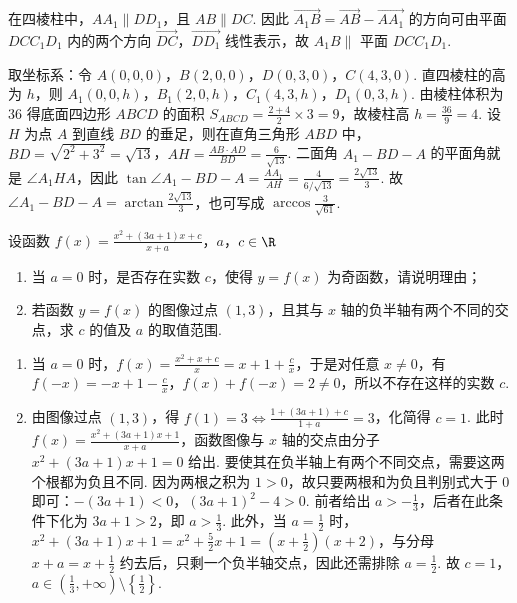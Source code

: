 \begin{solution}
在四棱柱中，\(AA_1\parallel DD_1\)，且 \(AB\parallel DC\). 因此 \(\overrightarrow{A_1B}=\overrightarrow{AB}-\overrightarrow{AA_1}\) 的方向可由平面 \(DCC_1D_1\) 内的两个方向 \(\overrightarrow{DC}\)，\(\overrightarrow{DD_1}\) 线性表示，故 \(A_1B\parallel\) 平面 \(DCC_1D_1\).

取坐标系：令 \(A(0,0,0)\)，\(B(2,0,0)\)，\(D(0,3,0)\)，\(C(4,3,0)\). 直四棱柱的高为 \(h\)，则 \(A_1(0,0,h)\)，\(B_1(2,0,h)\)，\(C_1(4,3,h)\)，\(D_1(0,3,h)\). 由棱柱体积为 \(36\) 得底面四边形 \(ABCD\) 的面积 \(S_{ABCD}=\frac{2+4}{2}\times 3=9\)，故棱柱高 \(h=\frac{36}{9}=4\).
设 \(H\) 为点 \(A\) 到直线 \(BD\) 的垂足，则在直角三角形 \(ABD\) 中，\(BD=\sqrt{2^2+3^2}=\sqrt{13}\)，\(AH=\frac{AB\cdot AD}{BD}=\frac{6}{\sqrt{13}}\). 二面角 \(A_1-BD-A\) 的平面角就是 \(\angle A_1HA\)，因此 \(\tan\angle A_1-BD-A=\frac{AA_1}{AH}=\frac{4}{6/\sqrt{13}}=\frac{2\sqrt{13}}{3}\). 故 \(\angle A_1-BD-A=\arctan\frac{2\sqrt{13}}{3}\)，也可写成 \(\arccos\frac{3}{\sqrt{61}}\).
\end{solution}

\begin{problem}
设函数 \(f(x)=\frac{x^2+(3a+1)x+c}{x+a}\)，\(a\)，\(c\in\R\)
\begin{enumerate}
\item 当 \(a=0\) 时，是否存在实数 \(c\)，使得 \(y=f(x)\) 为奇函数，请说明理由；
\item 若函数 \(y=f(x)\) 的图像过点 \((1,3)\)，且其与 \(x\) 轴的负半轴有两个不同的交点，求 \(c\) 的值及 \(a\) 的取值范围.
\end{enumerate}
\end{problem}

\begin{solution}
\begin{enumerate}
\item 当 \(a=0\) 时，\(f(x)=\frac{x^2+x+c}{x}=x+1+\frac{c}{x}\)，于是对任意 \(x\ne 0\)，有 \(f(-x)=-x+1-\frac{c}{x}\)，\(f(x)+f(-x)=2\neq 0\)，所以不存在这样的实数 \(c\).

\item 由图像过点 \((1,3)\)，得 \(f(1)=3\iff \frac{1+(3a+1)+c}{1+a}=3\)，化简得 \(c=1\).
此时 \(f(x)=\frac{x^2+(3a+1)x+1}{x+a}\)，函数图像与 \(x\) 轴的交点由分子 \(x^2+(3a+1)x+1=0\) 给出. 要使其在负半轴上有两个不同交点，需要这两个根都为负且不同.
因为两根之积为 \(1>0\)，故只要两根和为负且判别式大于 \(0\) 即可：\(-(3a+1)<0\)，\((3a+1)^2-4>0\).
前者给出 \(a>-\frac13\)，后者在此条件下化为 \(3a+1>2\)，即 \(a>\frac13\).
此外，当 \(a=\frac12\) 时，\(x^2+\left(3a+1\right)x+1=x^2+\frac52x+1=\left(x+\frac12\right)\left(x+2\right)\)，与分母 \(x+a=x+\frac12\) 约去后，只剩一个负半轴交点，因此还需排除 \(a=\frac12\).
故 \(c=1\)，\(a\in\left(\frac13,+\infty\right)\setminus\left\{\frac12\right\}\).
\end{enumerate}
\end{solution}

